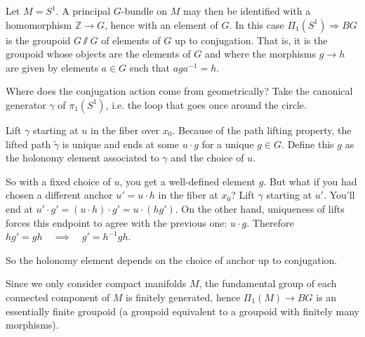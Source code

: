 \documentclass[12pt]{article}
\begin{document}
\begin{example}
    Let $M = S^1$. A principal $G$-bundle on $M$ may then be identified with a homomorphism $\mathbb{Z} \to G$, hence with an element of $G$. In this case $\Pi_1(S^1) \Rightarrow BG$ is the groupoid $G\sslash G$ of elements of $G$ up to conjugation. That is, it is the groupoid whose objects are the elements of $G$ and where the morphisms $g \to h$ are given by elements $a \in G$ such that $a g a^{-1} = h$.

    Where does the conjugation action come from geometrically? Take the canonical generator $\gamma$ of $\pi_1(S^1)$, i.e. the loop that goes once around the circle.

    Lift $\gamma$ starting at $u$ in the fiber over $x_0$. Because of the path lifting property, the lifted path $\tilde\gamma$ is unique and ends at some $u\cdot g$ for a unique $g\in G$. Define this $g$ as the holonomy element associated to $\gamma$ and the choice of $u$.

    So with a fixed choice of $u$, you get a well-defined element $g$. But what if you had chosen a different anchor $u' = u\cdot h$ in the fiber at $x_0$? Lift $\gamma$ starting at $u'$. You'll end at $u' \cdot g' = (u\cdot h)\cdot g' = u\cdot (h g')$. On the other hand, uniqueness of lifts forces this endpoint to agree with the previous one: $u\cdot g$. Therefore $h g' = g h \quad\implies\quad g' = h^{-1} g h$.

    So the holonomy element depends on the choice of anchor up to conjugation.
\end{example}

Since we only consider compact manifolds $M$, the fundamental group of each connected component of $M$ is finitely generated, hence $\Pi_1(M) \to BG$ is an essentially finite groupoid (a groupoid equivalent to a groupoid with finitely many morphisms).
\end{document}
